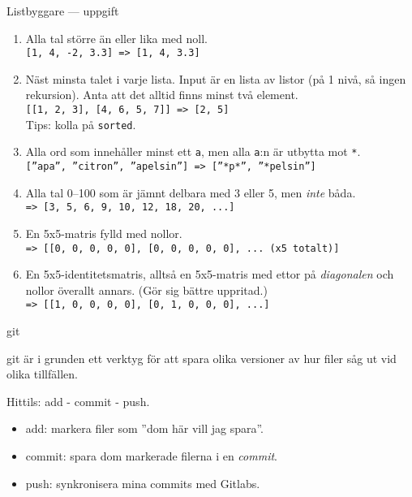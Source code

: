 \documentclass{beamer}
\begin{document}
  \begin{frame}{Listbyggare --- uppgift}

    \footnotesize

    \pause{}

    \begin{enumerate}[<+->]
      \item Alla tal större än eller lika med noll. \\
            \texttt{[1, 4, -2, 3.3] => [1, 4, 3.3]}

      \item Näst minsta talet i varje lista. Input är en lista av listor (på 1
            nivå, så ingen rekursion). Anta att det alltid finns minst två element. \\
            \texttt{[[1, 2, 3], [4, 6, 5, 7]] => [2, 5]} \\
            Tips: kolla på \texttt{sorted}.

      \item Alla ord som innehåller minst ett \texttt{a}, men alla \texttt{a}:n
            är utbytta mot \texttt{*}. \\
            \texttt{[''apa'', ''citron'', ''apelsin''] => [''*p*'', ''*pelsin'']}

      \item Alla tal 0--100 som är jämnt delbara med 3 eller 5, men
            \emph{inte} båda. \\
            \texttt{=> [3, 5, 6, 9, 10, 12, 18, 20, ...]}

      \item En 5x5-matris fylld med nollor. \\
            \texttt{=> [[0, 0, 0, 0, 0], [0, 0, 0, 0, 0], ... (x5 totalt)]}

      \item En 5x5-identitetsmatris, alltså en 5x5-matris med ettor på
            \emph{diagonalen} och nollor överallt annars. (Gör sig bättre uppritad.) \\
            \texttt{=> [[1, 0, 0, 0, 0], [0, 1, 0, 0, 0], ...]}


    \end{enumerate}

  \end{frame}

  \begin{frame}{git}

    git är i grunden ett verktyg för att spara olika versioner av hur filer såg
    ut vid olika tillfällen.

    Hittils: add - commit - push.

    \pause{}

    \begin{itemize}[<+->]
      \item add: markera filer som ''dom här vill jag spara''.
      \item commit: spara dom markerade filerna i en \emph{commit}.
      \item push: synkronisera mina commits med Gitlabs.
    \end{itemize}

  \end{frame}
\end{document}
